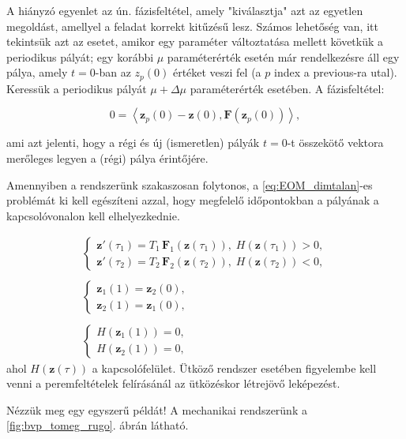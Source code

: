 A hiányzó egyenlet az ún. fázisfeltétel, amely "kiválasztja" azt az egyetlen megoldást, amellyel a feladat korrekt kitűzésű lesz. Számos lehetőség van, itt tekintsük azt az esetet, amikor egy paraméter változtatása mellett követkük a periodikus pályát; egy korábbi $\mu$ paraméterérték esetén már rendelkezésre áll egy pálya, amely $t=0$-ban az $z_p(0)$ értéket veszi fel (a $p$ index a previous-ra utal). Keressük a periodikus pályát $\mu+ \Delta \mu$ paraméterérték esetében. A fázisfeltétel:

\begin{equation}
0=\left< \mathbf{z}_p(0)-\mathbf{z}(0),\mathbf{F}(\mathbf{z}_p(0))\right>,
\end{equation}

\noindent ami azt jelenti, hogy a régi és új (ismeretlen) pályák $t=0$-t összekötő vektora merőleges legyen a (régi) pálya érintőjére.


Amennyiben a rendszerünk szakaszosan folytonos, a \eqref{eq:EOM_dimtalan}-es problémát ki kell egészíteni azzal, hogy megfelelő időpontokban a pályának a kapcsolóvonalon kell elhelyezkednie.

\begin{equation}
\begin{matrix}
\begin{cases}
\mathbf{z}'(\tau_1) = T_1\,\mathbf{F}_1(\mathbf{z}(\tau_1)), \; H(\mathbf{z}(\tau_1)) > 0,\\
\mathbf{z}'(\tau_2) = T_2\,\mathbf{F}_2(\mathbf{z}(\tau_2)), \; H(\mathbf{z}(\tau_2)) < 0,
\end{cases} \\\\
\begin{cases}
\mathbf{z}_1(1) = \mathbf{z}_2(0), \\
\mathbf{z}_2(1) = \mathbf{z}_1(0),
\end{cases} \\\\
\begin{cases}
H(\mathbf{z}_1(1)) = 0, \\
H(\mathbf{z}_2(1)) = 0,
\end{cases}
\end{matrix}
\end{equation}
ahol $H(\mathbf{z}(\tau))$  a kapcsolófelület.
Ütköző rendszer esetében figyelembe kell venni a peremfeltételek felírásánál az ütközéskor létrejövő leképezést.

Nézzük meg egy egyszerű példát! A mechanikai rendszerünk a \ref{fig:bvp_tomeg_rugo}. ábrán látható.

